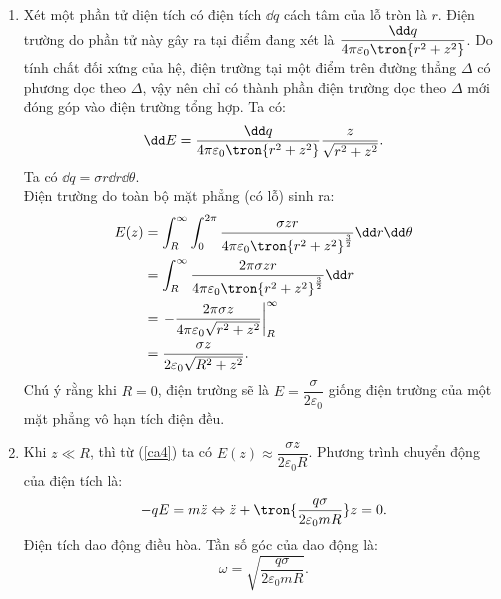     \begin{loigiai}
        \begin{enumerate}[1)]
        \setlength{\itemsep}{0pt}
            \item Xét một phần tử diện tích có điện tích $\dd q$ cách tâm của lỗ tròn là $r$. Điện trường do phần tử này gây ra tại điểm đang xét là $\dfrac{\dd q}{4\pi \varepsilon_0\tron{r^2+z^2}}$. Do tính chất đối xứng của hệ, điện trường tại một điểm trên đường thẳng $\Delta$ có phương dọc theo $\Delta$, vậy nên chỉ có thành phần điện trường dọc theo $\Delta$ mới đóng góp vào điện trường tổng hợp. Ta có:
            \begin{equation}
                \dd E=\dfrac{\dd q}{4\pi \varepsilon_0\tron{r^2+z^2}}\frac{z}{\sqrt{r^2+z^2}}.
                \label{ca4}
            \end{equation}
            Ta có $\dd q=\sigma r\dd r\dd \theta$. \\
            \newpage
            Điện trường do toàn bộ mặt phẳng (có lỗ) sinh ra:
            \begin{equation}
               \begin{aligned}
                  E(z)&=\int_R^\infty\int_0^{2\pi}\dfrac{\sigma zr}{4\pi \varepsilon_0\tron{r^2+z^2}^\frac{3}{2}}\dd r \dd \theta\\
                  &=\int_R^\infty\dfrac{2\pi \sigma zr}{4\pi \varepsilon_0\tron{r^2+z^2}^\frac{3}{2}}\dd r \\
                  &=\left.-\dfrac{2\pi \sigma z}{4\pi \varepsilon_0\sqrt{r^2+z^2}}\right|_R^\infty\\
                  &=\dfrac{\sigma z}{2\varepsilon_0\sqrt{R^2+z^2}}.
                  \label{ca4}
               \end{aligned} 
            \end{equation}
            Chú ý rằng khi $R=0$, điện trường sẽ là $E=\dfrac{\sigma}{2\varepsilon_0}$ giống điện trường của một mặt phẳng vô hạn tích điện đều.
            \item Khi $z\ll R$, thì từ (\ref{ca4}) ta có $E(z)\approx \dfrac{\sigma z}{2\varepsilon_0R}$. Phương trình chuyển động của điện tích  là:
            \begin{equation}
                -qE=m\ddot z\Leftrightarrow \ddot z+\tron{\dfrac{q\sigma}{2\varepsilon_0mR}}z=0.
            \end{equation}
            Điện tích dao động điều hòa. Tần số góc của dao động là:
            \begin{equation}
                \omega=\sqrt{\dfrac{q\sigma}{2\varepsilon_0mR}}.

\end{equation}
\end{enumerate}
\end{loigiai}
